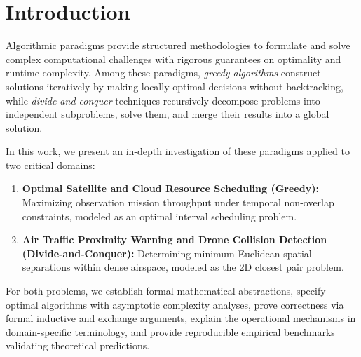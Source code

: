 \section{Introduction}
Algorithmic paradigms provide structured methodologies to formulate and solve complex computational challenges with rigorous guarantees on optimality and runtime complexity. Among these paradigms, \textit{greedy algorithms} construct solutions iteratively by making locally optimal decisions without backtracking, while \textit{divide-and-conquer} techniques recursively decompose problems into independent subproblems, solve them, and merge their results into a global solution.

In this work, we present an in-depth investigation of these paradigms applied to two critical domains:
\begin{enumerate}
    \item \textbf{Optimal Satellite and Cloud Resource Scheduling (Greedy):} Maximizing observation mission throughput under temporal non-overlap constraints, modeled as an optimal interval scheduling problem.
    \item \textbf{Air Traffic Proximity Warning and Drone Collision Detection (Divide-and-Conquer):} Determining minimum Euclidean spatial separations within dense airspace, modeled as the 2D closest pair problem.
\end{enumerate}

For both problems, we establish formal mathematical abstractions, specify optimal algorithms with asymptotic complexity analyses, prove correctness via formal inductive and exchange arguments, explain the operational mechanisms in domain-specific terminology, and provide reproducible empirical benchmarks validating theoretical predictions.

